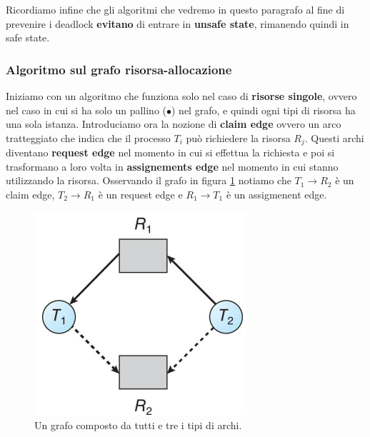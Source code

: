 \begin{figure}[h]
    \centering

\end{figure}

\noindent Ricordiamo infine che gli algoritmi che vedremo in questo paragrafo al fine di prevenire i deadlock \textbf{evitano} di entrare in \textbf{unsafe state}, rimanendo quindi in safe state.
% 
\subsubsection{Algoritmo sul grafo risorsa-allocazione}
Iniziamo con un algoritmo che funziona solo nel caso di \textbf{risorse singole}, ovvero nel caso in cui si ha solo un pallino ($\bullet$) nel grafo, e quindi ogni tipi di risorsa ha una sola istanza. Introduciamo ora la nozione di \textbf{claim edge} ovvero un arco tratteggiato che indica che il processo $T_i$ può richiedere la risorsa $R_j$. Questi archi diventano \textbf{request edge} nel momento in cui si effettua la richiesta e poi si trasformano a loro volta in \textbf{assignements edge} nel momento in cui stanno utilizzando la risorsa. Osservando il grafo in figura \ref{fig:claim_edge} notiamo che $T_1 \to R_2$ è un claim edge, $T_2 \to R_1$ è un request edge e $R_1 \to T_1$ è un assigmenent edge. 
\begin{figure}[h]
    \centering
    \includegraphics[width = .4\textwidth]{../res/imgs/deadlocks/claim_edge.png}
    \caption{Un grafo composto da tutti e tre i tipi di archi.}
    \label{fig:claim_edge}
\end{figure}

